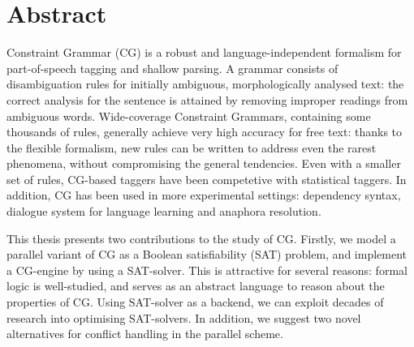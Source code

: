 \chapter*{Abstract}\label{chp:abstract}






Constraint Grammar (CG) is a robust and language-independent formalism 
for part-of-speech tagging and shallow parsing. 
A grammar consists of disambiguation rules for initially ambiguous, 
morphologically analysed text: the correct analysis for the sentence 
is attained by removing improper readings from ambiguous words.
Wide-coverage Constraint Grammars, containing some thousands of rules, 
generally achieve very high accuracy for free text: 
thanks to the flexible formalism, new rules can be written 
to address even the rarest phenomena, without compromising the general tendencies.
Even with a smaller set of rules, CG-based taggers have been 
competetive with statistical taggers.
In addition, CG has been used in more experimental settings: dependency syntax,
dialogue system for language learning %
and anaphora resolution. %

This thesis presents two contributions to the study of CG.
Firstly, we model a parallel variant of CG as a 
Boolean satisfiability (SAT) problem, and
implement a CG-engine by using a SAT-solver.
This is attractive for several reasons: formal logic is well-studied,
and serves as an abstract language to reason about the properties of
CG. Using SAT-solver as a backend, we can exploit decades of 
research into optimising SAT-solvers.
In addition, we suggest two novel alternatives for 
conflict handling in the parallel scheme.

